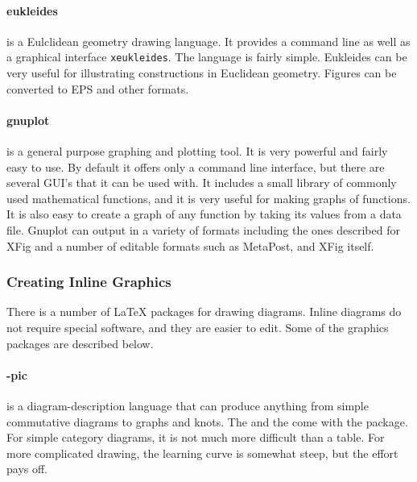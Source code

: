 \paragraph{eukleides}
 is a
Eulclidean geometry drawing language. It provides a command line as
well as a graphical interface \texttt{xeukleides}. The language
is fairly simple. Eukleides can be very useful for illustrating
constructions in Euclidean geometry. Figures can be converted to
EPS and other formats.

\paragraph{gnuplot}
is a general purpose graphing and plotting tool. It is very
powerful and fairly easy to use. By default it offers only a command
line interface, but there are several GUI's that it can be used with.
It includes a small library of commonly used mathematical functions,
and it is very useful for making graphs of functions. It is also easy to
create a graph of any function by taking its values from a data file.
Gnuplot can output in a variety of formats including the ones described
for XFig and a number of editable formats such as MetaPost, and XFig
itself.

\subsubsection{Creating Inline Graphics}
There is a number of \LaTeX{} packages for drawing diagrams. Inline diagrams do not require special software, and they are easier to edit. Some of the graphics packages are described below.

\paragraph{\Xy-pic}
 is a diagram-description language that can produce anything from simple commutative diagrams to graphs and knots. The  and the  come with the package. For simple category diagrams, it is not much more difficult than a table. For more complicated drawing, the learning curve is somewhat steep, but the effort pays off.

